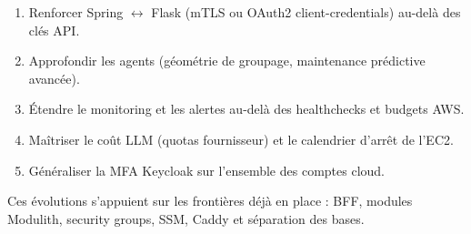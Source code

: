 \begin{enumerate}[leftmargin=*]
  \item Renforcer Spring $\leftrightarrow$ Flask (mTLS ou OAuth2 client-credentials) au-delà des clés API.
  \item Approfondir les agents (géométrie de groupage, maintenance prédictive avancée).
  \item Étendre le monitoring et les alertes au-delà des healthchecks et budgets AWS.
  \item Maîtriser le coût LLM (quotas fournisseur) et le calendrier d'arrêt de l'EC2.
  \item Généraliser la MFA Keycloak sur l'ensemble des comptes cloud.
\end{enumerate}

Ces évolutions s'appuient sur les frontières déjà en place : BFF, modules Modulith, security groups,
SSM, Caddy et séparation des bases.
